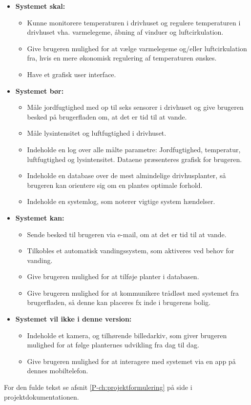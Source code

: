 \begin{itemize}
	\item \textbf{Systemet skal:}
		\begin{itemize}
			\item Kunne monitorere temperaturen i drivhuset og regulere temperaturen i drivhuset vha. varmelegeme, åbning af vinduer og luftcirkulation.
			\item Give brugeren mulighed for at vælge varmelegeme og/eller luftcirkulation fra, hvis en mere økonomisk regulering af temperaturen ønskes. 
			\item Have et grafisk user interface.
		\end{itemize}
	\item \textbf{Systemet bør:}
		\begin{itemize}
			\item Måle jordfugtighed med op til seks sensorer i drivhuset og give brugeren besked på brugerfladen om, at det er tid til at vande. 
			\item Måle lysintensitet og luftfugtighed i drivhuset.
			\item Indeholde en log over alle målte parametre: Jordfugtighed, temperatur, luftfugtighed og lysintensitet. 
			Dataene præsenteres grafisk for brugeren.
			\item Indeholde en database over de mest almindelige drivhusplanter, så brugeren kan orientere sig om en plantes optimale forhold.
			\item Indeholde en systemlog, som noterer vigtige system hændelser.
		\end{itemize}
	\item \textbf{Systemet kan:}
		\begin{itemize}
			\item Sende besked til brugeren via e-mail, om at det er tid til at vande.
			\item Tilkobles et automatisk vandingssystem, som aktiveres ved behov for vanding. 
			\item Give brugeren mulighed for at tilføje planter i databasen.
			\item Give brugeren mulighed for at kommunikere trådløst med systemet fra brugerfladen, så denne kan placeres fx inde i brugerens bolig. 
		\end{itemize}
	\item \textbf{Systemet vil ikke i denne version:}	
		\begin{itemize}
			\item Indeholde et kamera, og tilhørende billedarkiv, som giver brugeren mulighed for at følge planternes udvikling fra dag til dag. 
			\item Give brugeren mulighed for at interagere med systemet via en app på dennes mobiltelefon. 
		\end{itemize}
\end{itemize}

For den fulde tekst se afsnit \ref{P-ch:projektformulering}  på side \pageref{P-ch:projektformulering} i projektdokumentationen.

\clearpage